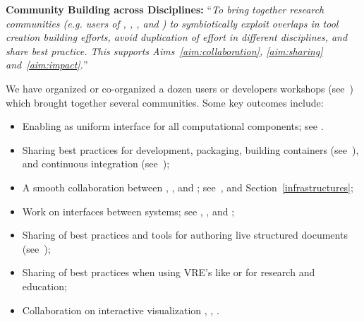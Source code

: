 \begin{compactenum}[\bf {Obj} 1\rm]
\item \label{objective:community}
  \textbf{Community Building across Disciplines:}
  ``\emph{To bring together research
    communities (e.g. users of \Jupyter, \Sage, \Singular, and \GAP) to
    symbiotically exploit overlaps in tool creation building efforts,
    avoid duplication of effort in different disciplines, and share best
    practice. This supports Aims~\ref{aim:collaboration},
    \ref{aim:sharing} and~\ref{aim:impact}.}''

  We have organized or co-organized a dozen users or developers
  workshops (see~) which brought
  together several communities. Some key outcomes include:
  \begin{itemize}
  \item Enabling \Jupyter as uniform interface for all computational
    components; see .
  \item Sharing best practices for development, packaging, building
    containers
    (see~),
    and continuous integration
    (see~);
  \item A smooth collaboration between \JupyterHub, \SMC, and \Simulagora;
    see~,
     and
    Section~\ref{infrastructures};
  \item Work on interfaces between systems; see
    , ,
    and ;
  \item Sharing of best practices and tools for authoring live structured
    documents (see~);
  \item Sharing of best practices when using VRE's like \cocalc or \Jupyter for research and
    education;
  \item Collaboration on interactive visualization
    , ,
    .
  \end{itemize}


\end{compactenum}

